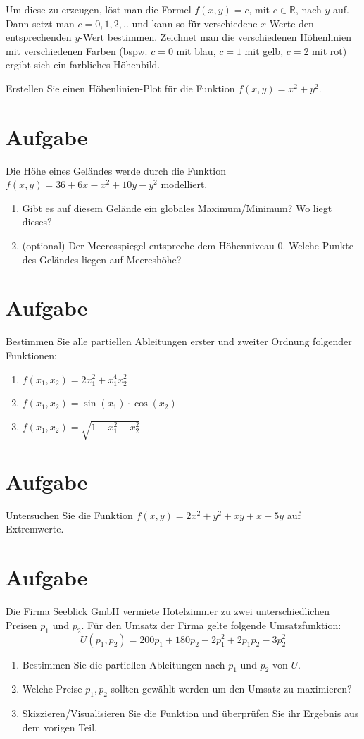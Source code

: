 \documentclass[fontsize=11pt, parskip=half]{scrartcl}
\newcommand{\R}{\mathbb{R}}
\begin{document}
Um diese zu erzeugen, löst man die Formel $f(x,y) = c$, mit $c \in \R$, nach $y$ auf. Dann setzt man $c = 0,1,2,..$ und kann so für verschiedene $x$-Werte den entsprechenden $y$-Wert bestimmen. Zeichnet man die verschiedenen Höhenlinien mit verschiedenen Farben (bspw. $c=0$ mit blau, $c=1$ mit gelb, $c= 2$ mit rot) ergibt sich ein farbliches Höhenbild.

Erstellen Sie einen Höhenlinien-Plot für die Funktion $f(x,y) = x^2 + y^2$.


\section{Aufgabe}
Die Höhe eines Geländes werde durch die Funktion $f(x,y) = 36 + 6x -x^2 + 10 y - y^2$ modelliert.
\begin{enumerate}[label=\alph*)]
    \item Gibt es auf diesem Gelände ein globales Maximum/Minimum? Wo liegt dieses?
    \item (optional) Der Meeresspiegel entspreche dem Höhenniveau $0$. Welche Punkte des Geländes liegen auf Meereshöhe?
\end{enumerate}


\section{Aufgabe}
Bestimmen Sie alle partiellen Ableitungen erster und zweiter Ordnung folgender Funktionen:
\begin{enumerate}[label=\alph*)]
    \item $f(x_1,x_2) = 2x_1^2+x_1^4x_2^2$
    \item $f(x_1,x_2) = \sin ( x_1)\cdot \cos (x_2)$
    \item $f(x_1,x_2) = \sqrt{1-x_1^2-x_2^2}$
\end{enumerate}

\section{Aufgabe}
Untersuchen Sie die Funktion $f(x,y)= 2x ^2 + y^2+xy+x-5y$ auf Extremwerte.

\section{Aufgabe}
Die Firma Seeblick GmbH vermiete Hotelzimmer zu zwei unterschiedlichen Preisen $p_1$ und $p_2$. Für den Umsatz
der Firma gelte folgende Umsatzfunktion:
\[U(p_1,p_2) = 200p_1 +180p_2 -2p^2_1 +2p_1 p_2 -3p^2_2
    \]
\begin{enumerate}[label=\alph*)]
    \item Bestimmen Sie die partiellen Ableitungen nach $p_1$ und $p_2$ von $U$.
    \item Welche Preise $p_1,p_2$ sollten gewählt werden um den Umsatz zu maximieren?
    \item Skizzieren/Visualisieren Sie die Funktion und überprüfen Sie ihr Ergebnis aus dem vorigen Teil.
\end{enumerate}    
\end{document}
